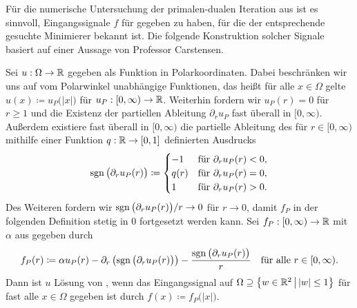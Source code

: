 Für die numerische Untersuchung der primalen-dualen Iteration aus
 ist es sinnvoll, Eingangssignale $f$ für
 gegeben zu haben, für die der entsprechende
gesuchte Minimierer bekannt ist. 
Die folgende Konstruktion solcher Signale basiert auf einer Aussage von
Professor Carstensen.

Sei $u:\Omega\to\mathbb{R}$ gegeben als Funktion in Polarkoordinaten. 
Dabei beschränken wir uns auf vom Polarwinkel unabhängige Funktionen, das heißt
für alle $x\in\Omega$ gelte
$u(x)\coloneqq u_P\big(|x|\big)$ für $u_P:[0,\infty)\to\mathbb{R}$. 
Weiterhin fordern wir $u_P(r)=0$ für $r\geq 1$ und die Existenz
der partiellen Ableitung $\partial_r u_P$ fast überall in $[0,\infty)$.
Außerdem existiere fast überall in $[0,\infty)$ die partielle Ableitung des für
$r\in[0,\infty)$ mithilfe einer Funktion $q:\mathbb{R}\to[0,1]$ definierten Ausdrucks
\begin{align*}
  \operatorname{sgn}\big(\partial_r u_P(r)\big)
  \coloneqq
  \begin{cases}
    -1 &\text{für }\partial_r u_P(r)<0,\\
    q(r) &\text{für }\partial_r u_P(r)=0,\\ 
    1 &\text{für }\partial_r u_P(r)>0.
  \end{cases}
\end{align*}
Des Weiteren fordern wir $\operatorname{sgn}\big(\partial_r u_P(r)\big)/r\to 0$ für $r\to 0$, 
damit $f_P$ in der folgenden Definition stetig in $0$ fortgesetzt werden kann.
Sei $f_P:[0,\infty)\to\mathbb{R}$ mit $\alpha$ aus 
gegeben durch
\begin{align}
  \label{eq:constructionInputSignal}
  f_P(r)
  \coloneqq 
  \alpha u_P(r) - \partial_r\left(\operatorname{sgn}\big(\partial_r u_P(r)\big)\right) 
  - \frac{\operatorname{sgn}\big(\partial_r u_P(r)\big)}{r}
  \quad\text{für alle }r\in[0,\infty).
\end{align}
Dann ist $u$ Lösung von , wenn das Eingangssignal
auf $\Omega\supseteq \left\{w\in\mathbb{R}^2\,\middle|\, |w|\leq 1\right\}$ für fast
alle $x\in\Omega$ gegeben ist durch $f(x)\coloneqq f_P\big(|x|\big)$.

